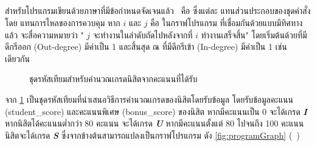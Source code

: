 \subsection{\FirstTimeDefine{\ProgramGraph}{\ProgramGraphEN}} 

สำหรับโปรแกรมเขียนด้วยภาษาที่มีข้อกำหนดจัดเจนแล้ว {\ProgramGraph}\ คือ \FirstTimeDefine{\DirectedGraph}{\DirectedGraphEN} 
ซึ่งแต่ละ {\FirstTimeDefine{\Node}{\NodeEN}} แทนส่วนประกอบของชุดคำสั่ง โดย{\FirstTimeDefine{\Edge}{\EdgeEN}} แทนการไหลของการควบคุม 
หาก $i$ และ $j$ คือ {\Node}ในกราฟโปรแกรม ที่เชื่อมกันด้วย{\Edge}แบบมีทิศทางแล้ว จะสื่อความหมายว่า "{\Node} $j$ จะทำงานในลำดับถัดไปหลังจากที่ $i$ 
ทำงานเสร็จสิ้น" \cite{Jorgensen2013} โดยเริ่มต้นด้วย{\Node}ที่มีดีกรีออก (Out-degree) มีค่าเป็น 1 และสิ้นสุด ณ \Node ที่มีดีกรีเข้า (In-degree) 
มีค่าเป็น 1 เช่นเดียวกัน

\begin{figure}[ht!]
    \begin{algorithm}[H]
        \begin{algorithmic}[1]

            \ELSE
            \ENDIF


            \ENDIF

        \end{algorithmic}
    \end{algorithm}
    \caption{ชุดรหัสเทียมสำหรับคำนวณเกรดนิสิตจากคะแนนที่ได้รับ}
    \label{fig:pseudocodeGrading}
\end{figure}

จาก{\figurename} \ref{fig:pseudocodeGrading} เป็นชุดรหัสเทียมที่นำเสนอวิธีการคำนวณเกรดของนิสิตโดยรับข้อมูล โดยรับข้อมูลคะแนน (student\_score)
และคะแนนพิเศษ (bonus\_score) ของนิสิต หากมีคะแนนเป็น 0 จะได้เกรด \emph{{\bf I}} หากนิสิตได้คะแนนต่ำกว่า 80 คะแนน จะได้เกรด 
{\emph{\bf U}} หากมีคะแนนตั้งแต่ 80 ไปจนถึง 100 คะแนน นิสิตจะได้เกรด {\emph{\bf S}} ซึ่งจาก{\sourcecode}ข้างต้นสามารถแปลงเป็นกราฟโปรแกรม
ดัง{\figurename} \ref{fig:programGraph} (\pagename\ \pageref{fig:programGraph})


